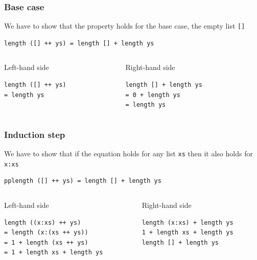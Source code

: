 \documentclass{beamer}
\begin{document}
\begin{frame}[fragile]
\frametitle{Base case}
We have to show that the property holds for the base case, the empty list \verb|[]|
\begin{verbatim}
length ([] ++ ys) = length [] + length ys
\end{verbatim}
\begin{columns}
  \begin{column}{.5\textwidth}
    \begin{block}{Left-hand side}
      \begin{verbatim}
length ([] ++ ys)
= length ys
\end{verbatim}
    \end{block}
  \end{column}
  \begin{column}{.5\textwidth}
    \begin{block}{Right-hand side}
\begin{verbatim}
length [] + length ys   
= 0 + length ys
= length ys
\end{verbatim}
    \end{block}
  \end{column}
\end{columns}
\end{frame}

\begin{frame}[fragile]
\frametitle{Induction step}
We have to show that if the equation holds for any list \verb|xs| then it also holds for \verb|x:xs|
\begin{verbatim}
pplength ([] ++ ys) = length [] + length ys
\end{verbatim}
\begin{columns}
  \begin{column}{.5\textwidth}
    \begin{block}{Left-hand side}
      \begin{verbatim}
length ((x:xs) ++ ys)      
= length (x:(xs ++ ys))    
= 1 + length (xs ++ ys)    
= 1 + length xs + length ys
\end{verbatim}
    \end{block}
  \end{column}
  \begin{column}{.5\textwidth}
    \begin{block}{Right-hand side}
\begin{verbatim}
length (x:xs) + length ys
1 + length xs + length ys
length [] + length ys   
\end{verbatim}
    \end{block}
  \end{column}
\end{columns}

\end{frame}
\end{document}
